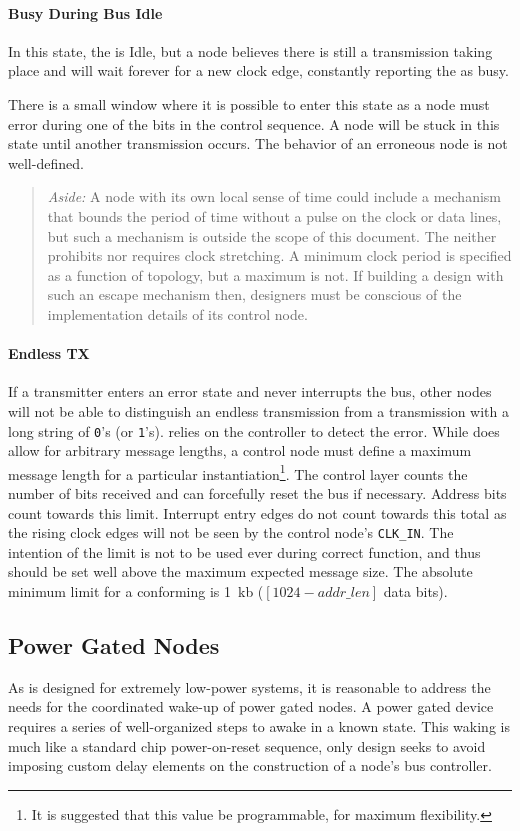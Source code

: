 \paragraph{Busy During Bus Idle}
In this state, the \bus is Idle, but a node believes there is still a
transmission taking place and will wait forever for a new clock edge,
constantly reporting the \bus as busy.

There is a small window where it is possible to enter this state as a node
must error during one of the bits in the control sequence. A node will be
stuck in this state until another transmission occurs. The behavior of an
erroneous node is not well-defined.

\begin{quote}
\textit{Aside:}
A node with its own local sense of time could include a mechanism that bounds
the period of time without a pulse on the clock or data lines, but such a
mechanism is outside the scope of this document. The \bus neither prohibits
nor requires clock stretching. A minimum clock period is specified as a
function of \bus topology, but a maximum is not. If building a design with
such an escape mechanism then, designers must be conscious of the
implementation details of its control node.
\end{quote}

\paragraph{Endless TX}
If a transmitter enters an error state and never interrupts the bus, other
nodes will not be able to distinguish an endless transmission from a
transmission with a long string of {\tt 0}'s (or {\tt 1}'s). \bus relies on
the controller to detect the error.  While \bus does allow for arbitrary
message lengths, a control node must define a maximum message length for a
particular \bus instantiation\footnote{
  It is suggested that this value be programmable, for maximum flexibility.
  }. The control layer counts the number of bits received and can forcefully
reset the bus if necessary. Address bits count towards this limit. Interrupt
entry edges do not count towards this total as the rising clock edges will not
be seen by the control node's {\tt CLK\_IN}. The intention of the limit is not
to be used ever during correct \bus function, and thus should be set well
above the maximum expected message size. The absolute minimum limit for a
conforming \bus is 1~kb ($[1024 - addr\_len]$ data bits).

\subsection{Power Gated Nodes}
\label{sec:design-power-gated}
As \bus is designed for extremely low-power systems, it is reasonable to
address the needs for the coordinated wake-up of power gated nodes. A power
gated device requires a series of well-organized steps to awake in a known
state. This waking is much like a standard chip power-on-reset sequence, only
\bus design seeks to avoid imposing custom delay elements on the construction
of a node's bus controller.

